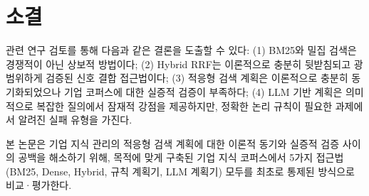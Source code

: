 \section{소결}
\label{sec:lit_summary_ko}

관련 연구 검토를 통해 다음과 같은 결론을 도출할 수 있다: (1) BM25와 밀집 검색은 경쟁적이 아닌 상보적 방법이다; (2) Hybrid RRF는 이론적으로 충분히 뒷받침되고 광범위하게 검증된 신호 결합 접근법이다; (3) 적응형 검색 계획은 이론적으로 충분히 동기화되었으나 기업 코퍼스에 대한 실증적 검증이 부족하다; (4) LLM 기반 계획은 의미적으로 복잡한 질의에서 잠재적 강점을 제공하지만, 정확한 논리 규칙이 필요한 과제에서 알려진 실패 유형을 가진다.

본 논문은 기업 지식 관리의 적응형 검색 계획에 대한 이론적 동기와 실증적 검증 사이의 공백을 해소하기 위해, 목적에 맞게 구축된 기업 지식 코퍼스에서 5가지 접근법(BM25, Dense, Hybrid, 규칙 계획기, LLM 계획기) 모두를 최초로 통제된 방식으로 비교·평가한다.
